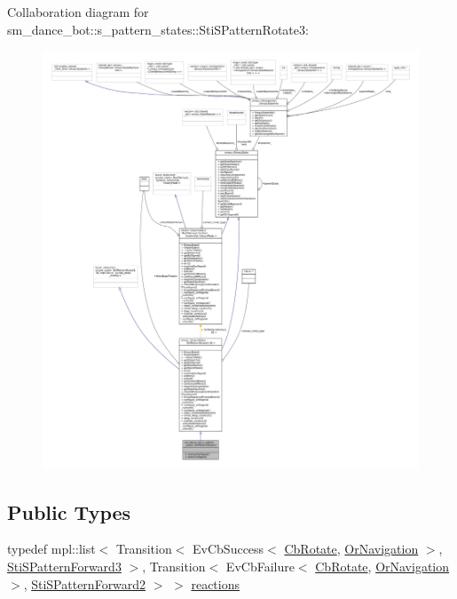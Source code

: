 Collaboration diagram for sm\+\_\+dance\+\_\+bot\+:\+:s\+\_\+pattern\+\_\+states\+:\+:Sti\+S\+Pattern\+Rotate3\+:
\nopagebreak
\begin{figure}[H]
\begin{center}
\leavevmode
\includegraphics[width=350pt]{structsm__dance__bot_1_1s__pattern__states_1_1StiSPatternRotate3__coll__graph}
\end{center}
\end{figure}
\subsection*{Public Types}
\begin{DoxyCompactItemize}
\item 
typedef mpl\+::list$<$ Transition$<$ Ev\+Cb\+Success$<$ \hyperlink{classcl__move__base__z_1_1CbRotate}{Cb\+Rotate}, \hyperlink{classsm__dance__bot_1_1OrNavigation}{Or\+Navigation} $>$, \hyperlink{structsm__dance__bot_1_1s__pattern__states_1_1StiSPatternForward3}{Sti\+S\+Pattern\+Forward3} $>$, Transition$<$ Ev\+Cb\+Failure$<$ \hyperlink{classcl__move__base__z_1_1CbRotate}{Cb\+Rotate}, \hyperlink{classsm__dance__bot_1_1OrNavigation}{Or\+Navigation} $>$, \hyperlink{structsm__dance__bot_1_1s__pattern__states_1_1StiSPatternForward2}{Sti\+S\+Pattern\+Forward2} $>$ $>$ \hyperlink{structsm__dance__bot_1_1s__pattern__states_1_1StiSPatternRotate3_a3c3103ecfffa5e136b58610b4906045a}{reactions}
\end{DoxyCompactItemize}
